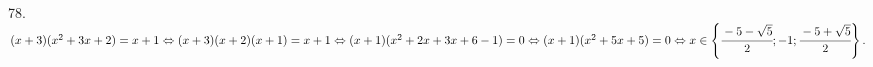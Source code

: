 78. $(x+3)(x^2+3x+2)=x+1\Leftrightarrow(x+3)(x+2)(x+1)=x+1\Leftrightarrow (x+1)(x^2+2x+3x+6-1)=0\Leftrightarrow(x+1)(x^2+5x+5)=0\Leftrightarrow
x\in\left\{\cfrac{-5-\sqrt{5}}{2}; -1; \cfrac{-5+\sqrt{5}}{2}\right\}.$\\
